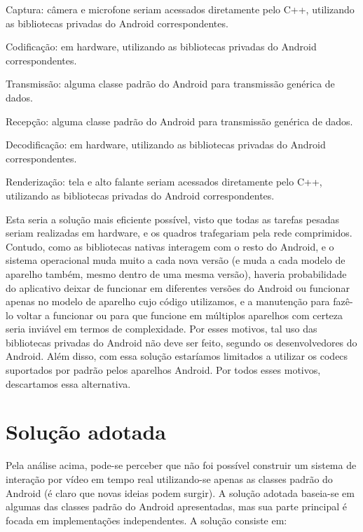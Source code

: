 \documentclass{acm_proc_article-sp}
\begin{document}
Captura: câmera e microfone seriam acessados diretamente pelo C++, utilizando as bibliotecas privadas do Android correspondentes.

Codificação: em hardware, utilizando as bibliotecas privadas do Android correspondentes.

Transmissão: alguma classe padrão do Android para transmissão genérica de dados.

Recepção: alguma classe padrão do Android para transmissão genérica de dados.

Decodificação: em hardware, utilizando as bibliotecas privadas do Android correspondentes.

Renderização: tela e alto falante seriam acessados diretamente pelo C++, utilizando as bibliotecas privadas do Android correspondentes.

Esta seria a solução mais eficiente possível, visto que todas as tarefas pesadas seriam realizadas em hardware, e os quadros trafegariam pela rede comprimidos. Contudo, como as bibliotecas nativas interagem com o resto do Android, e o sistema operacional muda muito a cada nova versão (e muda a cada modelo de aparelho também, mesmo dentro de uma mesma versão), haveria probabilidade do aplicativo deixar de funcionar em diferentes versões do Android ou funcionar apenas no modelo de aparelho cujo código utilizamos, e a manutenção para fazê-lo voltar a funcionar ou para que funcione em múltiplos aparelhos com certeza seria inviável em termos de complexidade. Por esses motivos, tal uso das bibliotecas privadas do Android não deve ser feito, segundo os desenvolvedores do Android. Além disso, com essa solução estaríamos limitados a utilizar os codecs suportados por padrão pelos aparelhos Android. Por todos esses motivos, descartamos essa alternativa.

\section{Solução adotada}

Pela análise acima, pode-se perceber que não foi possível construir um sistema de interação por vídeo em tempo real utilizando-se apenas as classes padrão do Android (é claro que novas ideias podem surgir). A solução adotada baseia-se em algumas das classes padrão do Android apresentadas, mas sua parte principal é focada em implementações independentes. A solução consiste em:
\end{document}
